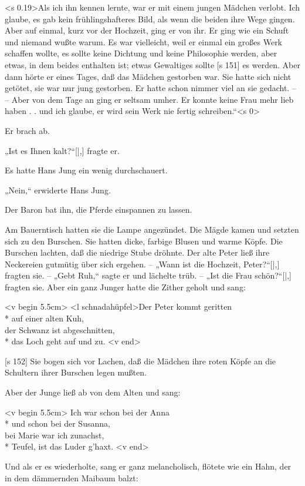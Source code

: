 <s 0.19>Als ich ihn kennen lernte, war er mit einem
jungen Mädchen verlobt. Ich glaube, es gab kein
frühlingshafteres Bild, als wenn die beiden ihre Wege
gingen. Aber auf einmal, kurz vor der Hochzeit,
ging er von ihr. Er ging wie ein Schuft und niemand
wußte warum. Es war vielleicht, weil er einmal
ein großes Werk schaffen wollte, es sollte keine
Dichtung und keine Philosophie werden, aber etwas,
in dem beides enthalten ist; etwas Gewaltiges sollte
[s 151]
es werden. Aber dann hörte er eines Tages, daß
das Mädchen gestorben war. Sie hatte sich nicht
getötet, sie war nur jung gestorben. Er hatte schon
nimmer viel an sie gedacht. – – Aber von dem
Tage an ging er seltsam umher. Er konnte keine
Frau mehr lieb haben . . und ich glaube, er wird
sein Werk nie fertig schreiben.“<s 0>

Er brach ab.

„Ist es Ihnen kalt?“[|,] fragte er.

Es hatte Hans Jung ein wenig durchschauert.

„Nein,“ erwiderte Hans Jung.

Der Baron bat ihn, die Pferde einspannen zu
lassen.

Am Bauerntisch hatten sie die Lampe angezündet.
Die Mägde kamen und setzten sich zu den Burschen.
Sie hatten dicke, farbige Blusen und warme Köpfe.
Die Burschen lachten, daß die niedrige Stube dröhnte.
Der alte Peter ließ ihre Neckereien gutmütig über
sich ergehen. – „Wann ist die Hochzeit, Peter?“[|,]
fragten sie. – „Gebt Ruh,“ sagte er und lächelte
trüb. – „Ist die Frau schön?“[|,] fragten sie. Aber
ein ganz Junger hatte die Zither geholt und sang:

<v begin 5.5cm>
<l schnadahüpfel>Der Peter kommt geritten\\*
auf einer alten Kuh,\\
der Schwanz ist abgeschnitten,\\*
das Loch geht auf und zu.
<v end>

[s 152]
Sie bogen sich vor Lachen, daß die Mädchen
ihre roten Köpfe an die Schultern ihrer Burschen
legen mußten.

Aber der Junge ließ ab von dem Alten und sang:

<v begin 5.5cm>
Ich war schon bei der Anna\\*
und schon bei der Susanna,\\
bei Marie war ich zunachst,\\*
Teufel, ist das Luder g'haxt.
<v end>

Und als er es wiederholte, sang er ganz
melancholisch, flötete wie ein Hahn, der in dem
dämmernden Maibaum balzt:

